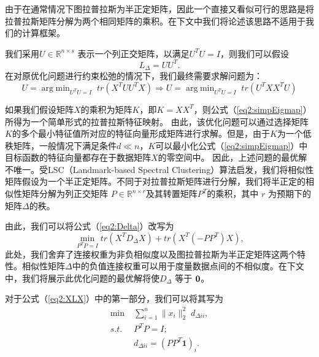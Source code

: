 由于在通常情况下图拉普拉斯为半正定矩阵，因此一个直接又看似可行的思路是将拉普拉斯矩阵分解为两个相同矩阵的乘积。在下文中我们将论述该思路不适用于我们的计算框架。

我们采用$U\in \mathbb{R}^{n\times s}$ 表示一个列正交矩阵，以满足$U^TU = I$，则我们可以假设
\begin{equation}
	L_\Delta = UU^T.
\end{equation}
在对原优化问题进行约束松弛的情况下，我们最终需要求解问题为：
\begin{equation}
		U = \mathop{\mathrm{arg\;min}}_{U^TU=I}\; tr(X^TUU^TX) 
		\Rightarrow U = \mathop{\mathrm{arg\;min}}_{U^TU=I} \;tr(U^TXX^TU)
	\label{eq2:simpEigmap}
\end{equation}

如果我们假设矩阵$X$的乘积为矩阵$K$，即$K = XX^T$，则公式（\ref{eq2:simpEigmap}）所得为一个简单形式的拉普拉斯特征映射\cite{belkin2001laplacian}。
由此，该优化问题可以通过选择矩阵$K$的多个最小特征值所对应的特征向量形成矩阵进行求解。但是，由于$K$为一个低秩矩阵，一般情况下满足条件$d\ll n$，$K$可以最小化公式（\ref{eq2:simpEigmap}）中目标函数的特征向量都存在于数据矩阵$X$的零空间中。
因此，上述问题的最优解不唯一。受LSC（Landmark-based Spectral Clustering）算法\cite{chen2011large}启发，我们将相似性矩阵假设为一个半正定矩阵。不同于对拉普拉斯矩阵进行分解，我们将半正定的相似性矩阵分解为列正交矩阵 $P\in \mathbb{R}^{n\times r}$及其转置矩阵$P^T$的乘积，其中 $r$ 为预期下的矩阵$\Delta$的秩。

由此，我们可以将公式（\ref{eq2:Delta}）改写为
\begin{equation}
	\mathop{\mathrm{min}}_{P^TP=I} tr(X^TD_\Delta X)+tr(X^T(-PP^T)X),
	\label{eq2:XLX}
\end{equation}
此处，我们舍弃了连接权重为非负相似度以及图拉普拉斯为半正定矩阵这两个特性。相似性矩阵$\Delta$中的负值连接权重可以用于度量数据点间的不相似度。在下文中，我们将展示此优化问题的最优解将使$D_\Delta$ 等于 $\bf0$。

对于公式（\ref{eq2:XLX}）中的第一部分，我们可以将其写为
\begin{equation}
	\begin{split}
		\mathop{\mathrm{min}}\;&\sum_{i=1}^{n} \|x_i\|_2^2\;d_{\Delta ii},\\
		s.t. \;\; &P^TP=I;\\
		&d_{\Delta ii}=(PP^T\textbf{1})_i.
	\end{split}
	\label{eq2:XD}
\end{equation}

